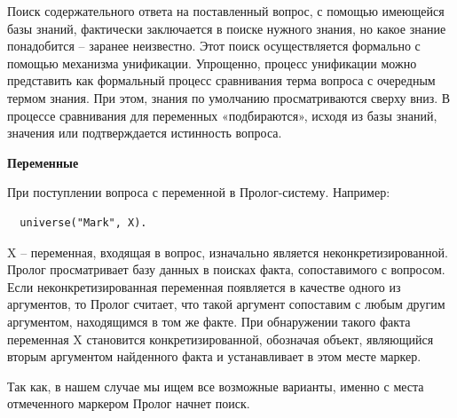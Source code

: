 \documentclass[a4paper,14pt]{extreport} %
\begin{document}
Поиск содержательного ответа на поставленный вопрос, с помощью имеющейся базы знаний, фактически заключается в поиске нужного знания, но какое знание понадобится – заранее неизвестно. Этот поиск осуществляется формально с помощью механизма унификации. Упрощенно, процесс унификации можно представить как формальный процесс сравнивания терма вопроса с очередным термом знания. При этом, знания по умолчанию просматриваются сверху вниз. В процессе сравнивания для переменных «подбираются», исходя из базы знаний, значения или подтверждается истинность вопроса. 

\textbf{Переменные}

При поступлении вопроса с переменной в Пролог-систему. Например:
\begin{lstlisting}
  universe("Mark", X).
\end{lstlisting}

X -- переменная, входящая в вопрос, изначально является неконкретизированной. Пролог просматривает базу данных в поисках факта, сопоставимого с вопросом. Если неконкретизированная переменная появляется в качестве одного из аргументов, то Пролог считает, что такой аргумент сопоставим с любым другим аргументом, находящимся в том же факте. При обнаружении такого факта переменная X становится конкретизированной, обозначая объект, являющийся вторым аргументом найденного факта и устанавливает в этом месте маркер.

Так как, в нашем случае мы ищем все возможные варианты, именно с места отмеченного маркером Пролог начнет поиск. 
\end{document}
